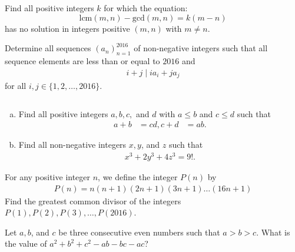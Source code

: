 \documentclass[problems.tex]{subfile}
\begin{document}
	\begin{problem}
		Find all positive integers $k$ for which the equation: $$ \text{lcm}(m,n)-\text{gcd}(m,n)=k(m-n)$$has no solution in integers positive $(m,n)$ with $m\neq n$. %
	\end{problem}
	
	
	\begin{problem}
		Determine all sequences $(a_n)_{n=1}^{2016}$ of non-negative integers such that all sequence elements are less than or equal to $2016$ and
		\begin{align*}
			i+j \mid ia_i + ja_j
		\end{align*}
		for all $i,j \in \{1, 2, \dots, 2016\}$.
	\end{problem}
	
	\begin{problem} $ $
		\begin{enumerate}[(a)]
			\item Find all positive integers $a, b, c,$ and $d$ with $a \leq b$ and $c \leq d$ such that
			\begin{align*}
				a + b &= cd,
				c + d &= ab.
			\end{align*}
			\item Find all non-negative integers $x, y$, and $z$ such that
			\begin{align*}
				x^3 + 2y^3 + 4z^3 = 9!.
			\end{align*}
		\end{enumerate}
	\end{problem}
	
	
	\begin{problem}
		For any positive integer $n$, we define the integer $P(n)$ by
		\begin{align*}
			P(n)=n(n+1)(2n+1)(3n+1)\dots(16n+1)
		\end{align*}
		Find the greatest common divisor of the integers $P(1), P(2), P(3),\dots,P(2016)$. %
	\end{problem}
	
	
	
	\begin{problem}
		Let $a, b$, and $c$ be three consecutive even numbers such that $a > b > c$. What is the value of $a^2 + b^2 + c^2 - ab - bc - ac$?
	\end{problem}
	
\end{document}
